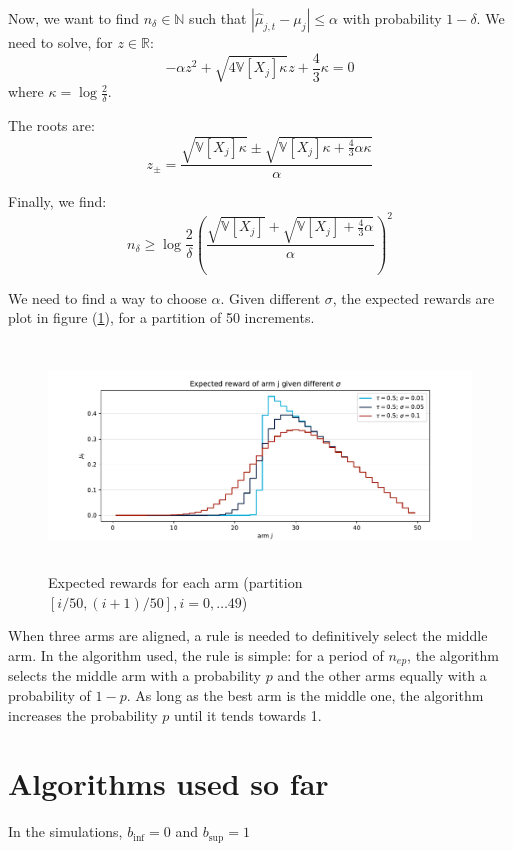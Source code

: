 \documentclass[11pt]{article}
\begin{document}
Now, we want to find $n_{\delta} \in \mathbb{N}$ such that $\left|\hat{\mu}_{j,t} -\mu_j\right| \leq \alpha$ with probability $1 - \delta$. We need to solve, for $z\in \mathbb{R}$:
\[
- \alpha z^2 + \sqrt{4 \mathbb{V}\left[X_j\right] \kappa} z + \frac{4}{3} \kappa = 0
\]
where $\kappa = \log\frac{2}{\delta}.$

The roots are:
\[
z_{\pm} = \frac{\sqrt{\mathbb{V}\left[X_j\right] \kappa} \pm \sqrt{\mathbb{V}\left[X_j\right]\kappa + \frac{4}{3}\alpha \kappa}}{ \alpha}
\]

Finally, we find:
\[
  n_{\delta} \geq \log\frac{2}{\delta} \left(\frac{\sqrt{\mathbb{V}\left[X_j\right] } + \sqrt{\mathbb{V}\left[X_j\right] + \frac{4}{3}\alpha }}{\alpha}\right)^2
\]

We need to find a way to choose $\alpha$. Given different $\sigma$, the expected rewards are plot in figure (\ref{fig:partition50}), for a partition of 50 increments.

\begin{figure}[H]
  \centering
  \includegraphics[height=6cm]{"../../figures/expect_rew_partition50.pdf"}
  \caption{Expected rewards for each arm (partition $[i/50, (i+1)/50], i = 0,\dots 49$)}
  \label{fig:partition50}
\end{figure}

When three arms are aligned, a rule is needed to definitively select the middle arm. 
In the algorithm used, the rule is simple: for a period of $n_{ep}$, the algorithm selects 
the middle arm with a probability $p$ and the other arms equally with a probability of $1 - p$. 
As long as the best arm is the middle one, the algorithm increases the probability $p$ until it tends towards 1.

\section{Algorithms used so far}

In the simulations, $b_{\inf} = 0$ and $b_{\sup} = 1$
\end{document}
